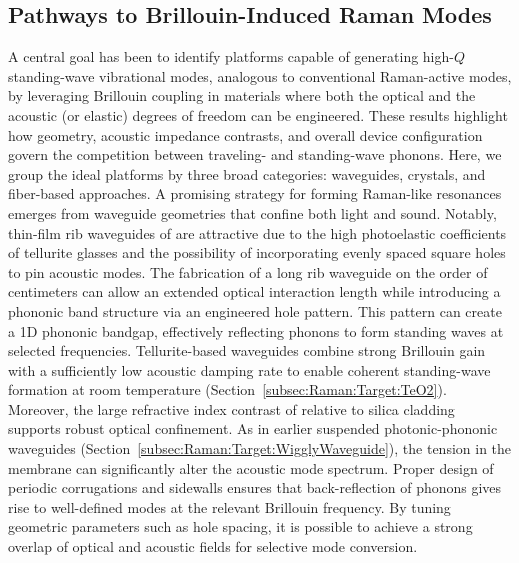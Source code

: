 \subsection{Pathways to Brillouin-Induced Raman Modes}
\label{subsec:Raman:Pathways}

A central goal has been to identify platforms capable of generating high-\(Q\) standing-wave vibrational modes, analogous to conventional Raman-active modes, by leveraging Brillouin coupling in materials where both the optical and the acoustic (or elastic) degrees of freedom can be engineered. These results highlight how geometry, acoustic impedance contrasts, and overall device configuration govern the competition between traveling- and standing-wave phonons. Here, we group the ideal platforms by three broad categories: waveguides,  crystals, and fiber-based approaches. A promising strategy for forming Raman-like resonances emerges from waveguide geometries that confine both light and sound. Notably, thin-film rib waveguides of  are attractive due to the high photoelastic coefficients of tellurite glasses and the possibility of incorporating evenly spaced square holes to pin acoustic modes. The fabrication of a long rib waveguide on the order of centimeters can allow an extended optical interaction length while introducing a phononic band structure via an engineered hole pattern. This pattern can create a 1D phononic bandgap, effectively reflecting phonons to form standing waves at selected frequencies. Tellurite-based waveguides combine strong Brillouin gain with a sufficiently low acoustic damping rate to enable coherent standing-wave formation at room temperature (Section~\ref{subsec:Raman:Target:TeO2}). Moreover, the large refractive index contrast of  relative to silica cladding supports robust optical confinement. As in earlier suspended photonic-phononic waveguides (Section~\ref{subsec:Raman:Target:WigglyWaveguide}), the tension in the membrane can significantly alter the acoustic mode spectrum. Proper design of periodic corrugations and sidewalls ensures that back-reflection of phonons gives rise to well-defined modes at the relevant Brillouin frequency. By tuning geometric parameters such as hole spacing, it is possible to achieve a strong overlap of optical and acoustic fields for selective mode conversion.

